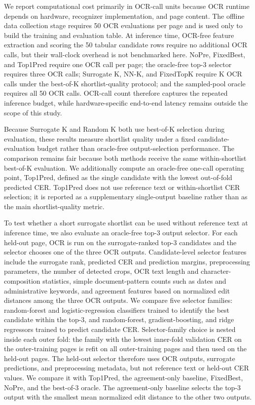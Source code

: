 \documentclass[pdflatex,sn-basic,Numbered,iicol]{sn-jnl}
\begin{document}
We report computational cost primarily in OCR-call units because OCR runtime depends on hardware, recognizer implementation, and page content. The offline data collection stage requires 50 OCR evaluations per page and is used only to build the training and evaluation table. At inference time, OCR-free feature extraction and scoring the 50 tabular candidate rows require no additional OCR calls, but their wall-clock overhead is not benchmarked here. NoPre, FixedBest, and Top1Pred require one OCR call per page; the oracle-free top-3 selector requires three OCR calls; Surrogate K, NN-K, and FixedTopK require K OCR calls under the best-of-K shortlist-quality protocol; and the sampled-pool oracle requires all 50 OCR calls. OCR-call count therefore captures the repeated inference budget, while hardware-specific end-to-end latency remains outside the scope of this study.

Because Surrogate K and Random K both use best-of-K selection during evaluation, these results measure shortlist quality under a fixed candidate-evaluation budget rather than oracle-free output-selection performance. The comparison remains fair because both methods receive the same within-shortlist best-of-K evaluation. We additionally compute an oracle-free one-call operating point, Top1Pred, defined as the single candidate with the lowest out-of-fold predicted CER. Top1Pred does not use reference text or within-shortlist CER selection; it is reported as a supplementary single-output baseline rather than as the main shortlist-quality metric.

To test whether a short surrogate shortlist can be used without reference text at inference time, we also evaluate an oracle-free top-3 output selector. For each held-out page, OCR is run on the surrogate-ranked top-3 candidates and the selector chooses one of the three OCR outputs. Candidate-level selector features include the surrogate rank, predicted CER and prediction margins, preprocessing parameters, the number of detected crops, OCR text length and character-composition statistics, simple document-pattern counts such as dates and administrative keywords, and agreement features based on normalized edit distances among the three OCR outputs. We compare five selector families: random-forest and logistic-regression classifiers trained to identify the best candidate within the top-3, and random-forest, gradient-boosting, and ridge regressors trained to predict candidate CER. Selector-family choice is nested inside each outer fold: the family with the lowest inner-fold validation CER on the outer-training pages is refit on all outer-training pages and then used on the held-out pages. The held-out selector therefore uses OCR outputs, surrogate predictions, and preprocessing metadata, but not reference text or held-out CER values. We compare it with Top1Pred, the agreement-only baseline, FixedBest, NoPre, and the best-of-3 oracle. The agreement-only baseline selects the top-3 output with the smallest mean normalized edit distance to the other two outputs.
\end{document}
